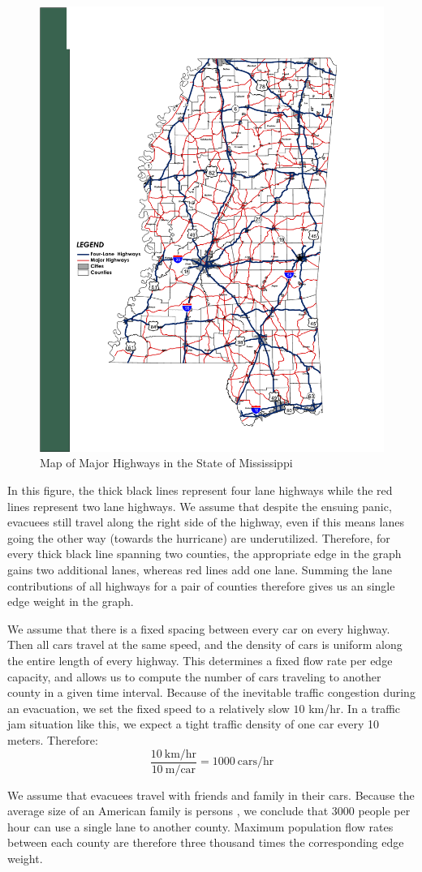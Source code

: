 \documentclass[titlepage]{article}
\begin{document}
  \begin{figure}[H]
    \centering
    \includegraphics[width=.5\textwidth]{ms_highways.pdf}
    \caption{Map of Major Highways in the State of Mississippi \cite{ms_highways}}
    \label{fig:highway_map}
  \end{figure}
  \par
    In this figure, the thick black lines represent four lane highways while the red lines represent two lane highways. We assume that despite the ensuing panic, evacuees still travel along the right side of the highway, even if this means lanes going the other way (towards the hurricane) are underutilized. Therefore, for every thick black line spanning two counties, the appropriate edge in the graph gains two additional lanes, whereas red lines add one lane. Summing the lane contributions of all highways for a pair of counties therefore gives us an single edge weight in the graph.
  \newline
  \par
    We assume that there is a fixed spacing between every car on every highway. Then all cars travel at the same speed, and the density of cars is uniform along the entire length of every highway. This determines a fixed flow rate per edge capacity, and allows us to compute the number of cars traveling to another county in a given time interval. Because of the inevitable traffic congestion during an evacuation, we set the fixed speed to a relatively slow $10$ km/hr. In a traffic jam situation like this, we expect a tight traffic density of one car every 10 meters. Therefore:
    \[
      \frac{10\ \text{km/hr}}{10\ \text{m/car}} = 1000\ \text{cars/hr}
    \]
  \par
    We assume that evacuees travel with friends and family in their cars. Because the average size of an American family is  persons \cite{famsize}, we conclude that 3000 people per hour can use a single lane to another county. Maximum population flow rates between each county are therefore three thousand times the corresponding edge weight.
\end{document}
